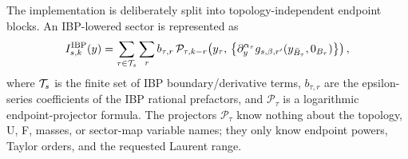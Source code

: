 \documentclass[11pt]{article}
\begin{document}
The implementation is deliberately split into topology-independent endpoint
blocks.  An IBP-lowered sector is represented as
\begin{equation}
  I_{s,k}^{\rm IBP}(y)
  =
  \sum_{\tau\in{\cal T}_s}
  \sum_{r}
  b_{\tau,r}\,
  \mathcal{P}_{\tau,k-r}
  \!\left(
    y_{\tau},\,
    \left\{
      \partial_y^{\alpha_\tau}
      g_{s,\beta,r'}(y_{\bar B_\tau},0_{B_\tau})
    \right\}
  \right),
\end{equation}
where \({\cal T}_s\) is the finite set of IBP boundary/derivative terms,
\(b_{\tau,r}\) are the epsilon-series coefficients of the IBP rational
prefactors, and \(\mathcal{P}_{\tau}\) is a logarithmic endpoint-projector
formula.  The projectors \(\mathcal{P}_{\tau}\) know nothing about the
topology, U, F, masses, or sector-map variable names; they only know endpoint
powers, Taylor orders, and the requested Laurent range.
\end{document}
